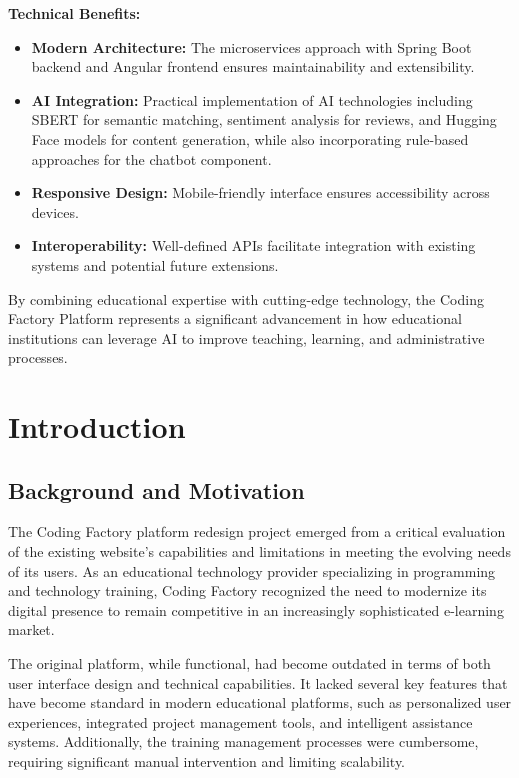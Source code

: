 \documentclass[12pt,a4paper]{report}
\begin{document}
\textbf{Technical Benefits:}
\begin{itemize}
    \item \textbf{Modern Architecture:} The microservices approach with Spring Boot backend and Angular frontend ensures maintainability and extensibility.

    \item \textbf{AI Integration:} Practical implementation of AI technologies including SBERT for semantic matching, sentiment analysis for reviews, and Hugging Face models for content generation, while also incorporating rule-based approaches for the chatbot component.

    \item \textbf{Responsive Design:} Mobile-friendly interface ensures accessibility across devices.

    \item \textbf{Interoperability:} Well-defined APIs facilitate integration with existing systems and potential future extensions.
\end{itemize}

By combining educational expertise with cutting-edge technology, the Coding Factory Platform represents a significant advancement in how educational institutions can leverage AI to improve teaching, learning, and administrative processes.

\chapter{Introduction}

\section{Background and Motivation}
The Coding Factory platform redesign project emerged from a critical evaluation of the existing website's capabilities and limitations in meeting the evolving needs of its users. As an educational technology provider specializing in programming and technology training, Coding Factory recognized the need to modernize its digital presence to remain competitive in an increasingly sophisticated e-learning market.

The original platform, while functional, had become outdated in terms of both user interface design and technical capabilities. It lacked several key features that have become standard in modern educational platforms, such as personalized user experiences, integrated project management tools, and intelligent assistance systems. Additionally, the training management processes were cumbersome, requiring significant manual intervention and limiting scalability.
\end{document}
